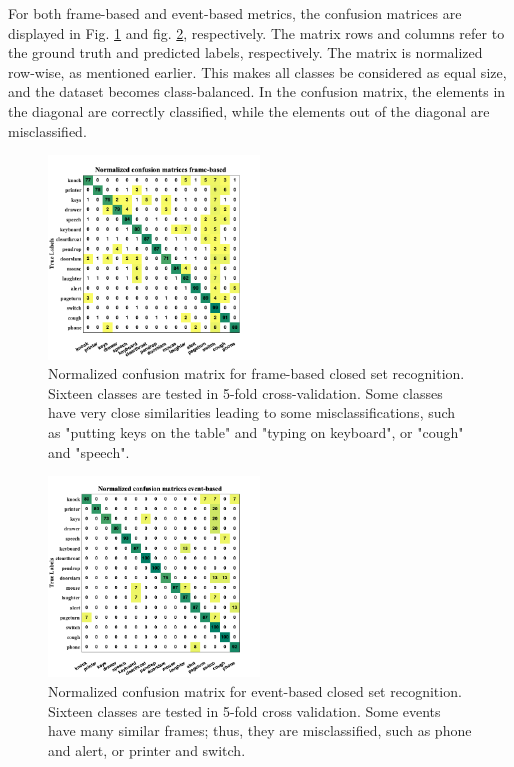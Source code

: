 \documentclass{ieeeaccess}
\begin{document}
For both frame-based and event-based metrics, the confusion matrices are displayed in Fig.  \ref{fig:fig6} and fig. \ref{fig:fig7}, respectively. The matrix rows and columns refer to the ground truth and predicted labels, respectively. The matrix is normalized row-wise, as mentioned earlier. This makes all classes be considered as equal size, and the dataset becomes class-balanced. In the confusion matrix, the elements in the diagonal are correctly classified, while the elements out of the diagonal are misclassified. 
\begin{figure}[hbt!]
	\centering
	\includegraphics[width=0.5\textwidth]{img/cm_frame.png}
	\caption{Normalized confusion matrix for frame-based closed set recognition. Sixteen classes are tested in 5-fold cross-validation. Some classes have very close similarities leading to some misclassifications, such as "putting keys on the table" and "typing on keyboard", or "cough" and "speech".}
	\label{fig:fig6}
\end{figure}
\begin{figure}[hbt!]
	\centering
	\includegraphics[width=0.5\textwidth]{img/cm_event.png}
	\caption{Normalized confusion matrix for event-based closed set recognition. Sixteen classes are tested in 5-fold cross validation. Some events have many similar frames; thus, they are misclassified, such as phone and alert, or printer and switch.}
	\label{fig:fig7}
\end{figure}
\end{document}
